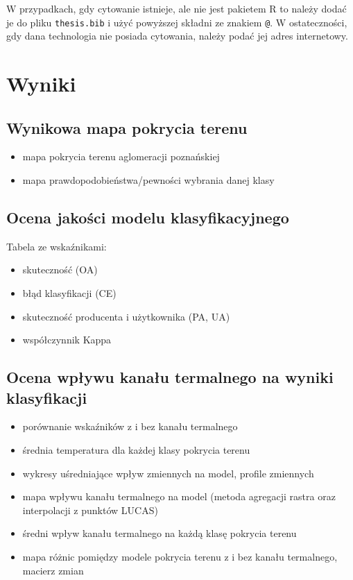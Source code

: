 \documentclass{amuthesis}
\begin{document}
W przypadkach, gdy cytowanie istnieje, ale nie jest pakietem R to należy
dodać je do pliku \texttt{thesis.bib} i użyć powyższej składni ze
znakiem \texttt{@}. W ostateczności, gdy dana technologia nie posiada
cytowania, należy podać jej adres internetowy.


\hypertarget{sec-wyniki}{%
\chapter{Wyniki}\label{sec-wyniki}}

\hypertarget{sec-mapa}{%
\section{Wynikowa mapa pokrycia terenu}\label{sec-mapa}}

\begin{itemize}
\item
  mapa pokrycia terenu aglomeracji poznańskiej
\item
  mapa prawdopodobieństwa/pewności wybrania danej klasy
\end{itemize}

\hypertarget{sec-ocena}{%
\section{Ocena jakości modelu klasyfikacyjnego}\label{sec-ocena}}

Tabela ze wskaźnikami:

\begin{itemize}
\item
  skuteczność (OA)
\item
  błąd klasyfikacji (CE)
\item
  skuteczność producenta i użytkownika (PA, UA)
\item
  współczynnik Kappa
\end{itemize}

\hypertarget{sec-wplyw}{%
\section{Ocena wpływu kanału termalnego na wyniki
klasyfikacji}\label{sec-wplyw}}

\begin{itemize}
\item
  porównanie wskaźników z i bez kanału termalnego
\item
  średnia temperatura dla każdej klasy pokrycia terenu
\item
  wykresy uśredniające wpływ zmiennych na model, profile zmiennych
\item
  mapa wpływu kanału termalnego na model (metoda agregacji rastra oraz
  interpolacji z punktów LUCAS)
\item
  średni wpływ kanału termalnego na każdą klasę pokrycia terenu
\item
  mapa różnic pomiędzy modele pokrycia terenu z i bez kanału termalnego,
  macierz zmian
\end{itemize}
\end{document}
